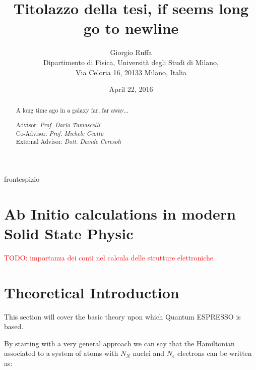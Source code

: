 \documentclass[a4paper,12pt]{article}
\newcommand\mynotes[1]{\begin{flushright}

\textcolor{red}{TODO: #1}\end{flushright}}
\begin{document}
\title{\bf \Huge Titolazzo della tesi, if seems long\\go to newline }


\author{Giorgio Ruffa\\
Dipartimento di Fisica, Universit\`a degli Studi di Milano,\\
Via Celoria 16, 20133 Milano, Italia
}
\date{April 22, 2016} %


 {frontespizio} %

\newpage\qquad
\newpage

\maketitle

\begin{abstract}

A long time ago in a galaxy far, far away...

\vskip0.75cm
\hskip5cm
\parbox[t]{7cm}
{
Advisor: {\it Prof. Dario Tamascelli}\\
Co-Advisor: {\it Prof. Michele Ceotto}\\
External Advisor: {\it Dott. Davide Ceresoli}\\
}
\end{abstract}

\newpage
\tableofcontents
\newpage


\section{Ab Initio calculations in modern Solid State Physic}
\mynotes{importanza dei conti nel calcula delle strutture elettroniche}


\section{Theoretical Introduction}\label{model:sec}

This section will cover the basic theory upon which Quantum ESPRESSO is based.

By starting with a very general approach we can say that the Hamiltonian associated to a system of atoms with $N_N$ nuclei and $N_e$ electrons can be written as:
\end{document}
